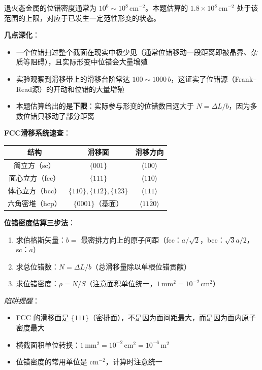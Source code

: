 \begin{insightbox}
退火态金属的位错密度通常为 $10^{6}\sim 10^{8}\,\mathrm{cm^{-2}}$。本题估算的 $1.8\times 10^{8}\,\mathrm{cm^{-2}}$ 处于该范围的上限，对应于已发生一定范性形变的状态。

\textbf{几点深化}：
\begin{itemize}
    \item 一个位错扫过整个截面在现实中极少见（通常位错移动一段距离即被晶界、杂质等阻碍），且实际形变中位错会大量增殖
    \item 实验观察到滑移带上的滑移台阶常达 $100\sim 1000\,b$，这证实了位错源（Frank--Read源）的开动和位错的大量增殖
    \item 本题估算给出的是\textbf{下限}：实际参与形变的位错数目远大于 $N=\Delta L/b$，因为多数位错只移动了部分距离
\end{itemize}
\end{insightbox}

\begin{thinkbox}
\textbf{FCC滑移系统速查}：
\begin{center}
\begin{tabular}{ccc}
\toprule
\textbf{结构} & \textbf{滑移面} & \textbf{滑移方向} \\
\midrule
简立方（sc） & $\{001\}$ & $\langle 100\rangle$ \\
面心立方（fcc） & $\{111\}$ & $\langle 110\rangle$ \\
体心立方（bcc） & $\{110\},\{112\},\{123\}$ & $\langle 111\rangle$ \\
六角密堆（hcp） & $\{0001\}$（基面） & $\langle 11\bar{2}0\rangle$ \\
\bottomrule
\end{tabular}
\end{center}
\vspace{4pt}
\textbf{位错密度估算三步法}：
\begin{enumerate}
    \item 求伯格斯矢量：$b = $ 最密排方向上的原子间距（fcc：$a/\sqrt{2}$，bcc：$\sqrt{3}a/2$，sc：$a$）
    \item 求总位错数：$N = \Delta L / b$（总滑移量除以单根位错贡献）
    \item 求位错密度：$\rho = N / S$（注意面积单位统一，$1\,\mathrm{mm^2}=10^{-2}\,\mathrm{cm^2}$）
\end{enumerate}
\textit{陷阱提醒}：
\begin{itemize}
    \item FCC 的滑移面是 $\{111\}$（密排面），不是因为面间距最大，而是因为面内原子密度最大
    \item 横截面积单位转换：$1\,\mathrm{mm^2} = 10^{-2}\,\mathrm{cm^2} = 10^{-6}\,\mathrm{m^2}$
    \item 位错密度的常用单位是 $\mathrm{cm^{-2}}$，计算时注意统一
\end{itemize}
\end{thinkbox}
